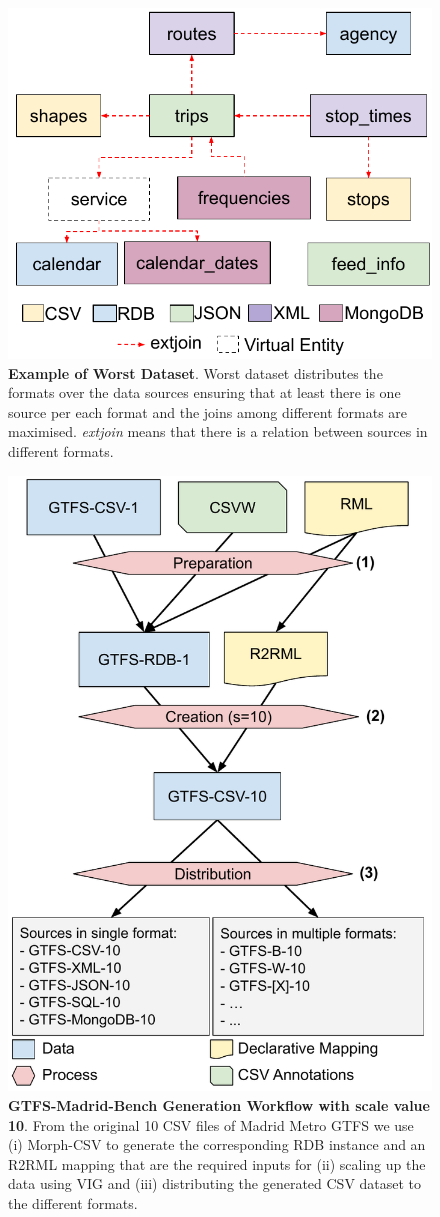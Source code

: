 \begin{figure}[h]
    \centering
    \includegraphics[width=0.85\linewidth]{figures/worst-dist.pdf}
    \caption[Example of worst dataset]{\textbf{Example of Worst Dataset}. Worst dataset distributes the formats over the data sources ensuring that at least there is one source per each format and the joins among different formats are maximised. \textit{extjoin} means that there is a relation between sources in different formats.}
    \label{fig:worst}
\end{figure}

\begin{figure}
    \centering
    \includegraphics[width=0.7\linewidth]{figures/gprocess.pdf}
    \caption[Generation workflow for scale value 10]{\textbf{GTFS-Madrid-Bench Generation Workflow with scale value 10}. From the original 10 CSV files of Madrid Metro GTFS we use (i) Morph-CSV to generate the corresponding RDB instance and an R2RML mapping that are the required inputs for (ii) scaling up the data using VIG and (iii) distributing the generated CSV dataset to the different formats.}
    \label{fig:generation}
\end{figure}

